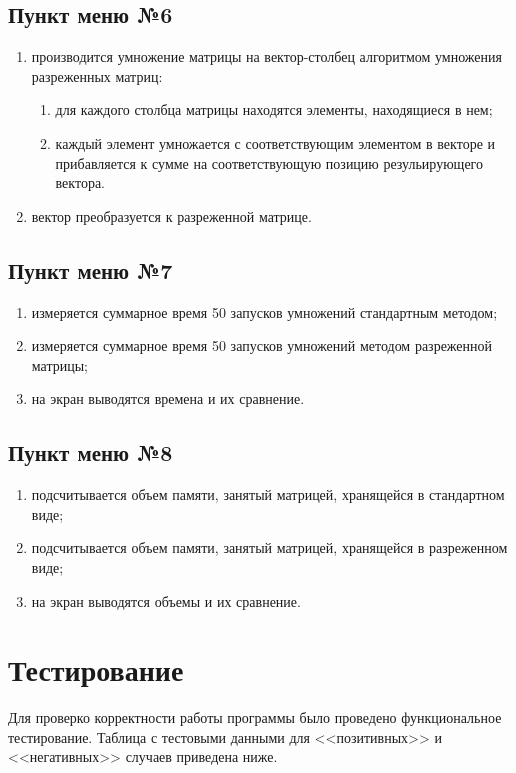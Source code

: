 \documentclass[a4paper,12pt]{extarticle}
\begin{document}
\subsection{Пункт меню №6}
\begin{enumerate}
    \item производится умножение матрицы на вектор-столбец алгоритмом умножения разреженных матриц:
    \begin{enumerate}
        \item для каждого столбца матрицы находятся элементы, находящиеся в нем;
        \item каждый элемент умножается с соответствующим элементом в векторе и прибавляется к сумме на соответствующую позицию резульирующего вектора.
    \end{enumerate}
    \item вектор преобразуется к разреженной матрице.
\end{enumerate}

\subsection{Пункт меню №7}
\begin{enumerate}
    \item измеряется суммарное время 50 запусков умножений стандартным методом;
    \item измеряется суммарное время 50 запусков умножений методом разреженной матрицы;
    \item на экран выводятся времена и их сравнение.
\end{enumerate}

\subsection{Пункт меню №8}
\begin{enumerate}
    \item подсчитывается объем памяти, занятый матрицей, хранящейся в стандартном виде;
    \item подсчитывается объем памяти, занятый матрицей, хранящейся в разреженном виде;
    \item на экран выводятся объемы и их сравнение.
\end{enumerate}

\newpage

\section{Тестирование}
Для проверко корректности работы программы было проведено функциональное тестирование. Таблица с тестовыми данными для <<позитивных>> и <<негативных>> случаев приведена ниже.
\end{document}
